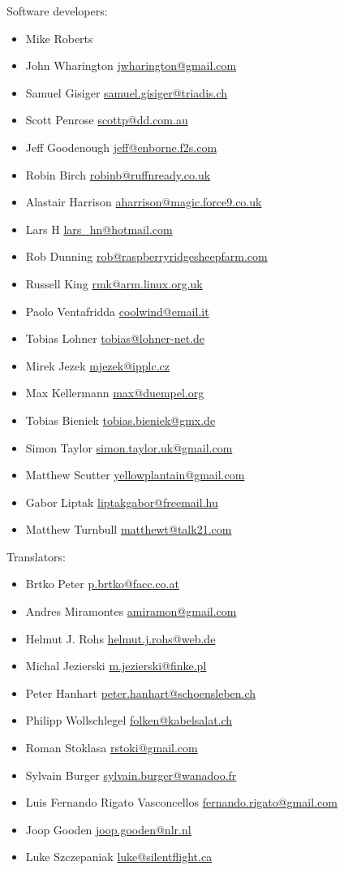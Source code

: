 \documentclass[a4paper,12pt]{refrep}
\begin{document}
Software developers:
\begin{itemize}
\item Mike Roberts 
\item John Wharington \url{jwharington@gmail.com}
\item Samuel Gisiger \url{samuel.gisiger@triadis.ch}
\item Scott Penrose \url{scottp@dd.com.au}
\item Jeff Goodenough \url{jeff@enborne.f2s.com}
\item Robin Birch \url{robinb@ruffnready.co.uk}
\item Alastair Harrison \url{aharrison@magic.force9.co.uk}
\item Lars H \url{lars_hn@hotmail.com}
\item Rob Dunning \url{rob@raspberryridgesheepfarm.com}
\item Russell King \url{rmk@arm.linux.org.uk}
\item Paolo Ventafridda \url{coolwind@email.it}
\item Tobias Lohner \url{tobias@lohner-net.de}
\item Mirek Jezek \url{mjezek@ipplc.cz}
\item Max Kellermann \url{max@duempel.org}
\item Tobias Bieniek \url{tobias.bieniek@gmx.de}
\item Simon Taylor \url{simon.taylor.uk@gmail.com}
\item Matthew Scutter \url{yellowplantain@gmail.com}
\item Gabor Liptak \url{liptakgabor@freemail.hu}
\item Matthew Turnbull \url{matthewt@talk21.com}
\end{itemize}

Translators:
\begin{itemize}
\item Brtko Peter \url{p.brtko@facc.co.at}
\item Andres Miramontes \url{amiramon@gmail.com}
\item Helmut J. Rohs \url{helmut.j.rohs@web.de}
\item Michal Jezierski \url{m.jezierski@finke.pl}
\item Peter Hanhart \url{peter.hanhart@schoensleben.ch}
\item Philipp Wollschlegel \url{folken@kabelsalat.ch}
\item Roman Stoklasa \url{rstoki@gmail.com}
\item Sylvain Burger \url{sylvain.burger@wanadoo.fr}
\item Luis Fernando Rigato Vasconcellos \url{fernando.rigato@gmail.com}
\item Joop Gooden \url{joop.gooden@nlr.nl}
\item Luke Szczepaniak \url{luke@silentflight.ca}
\end{itemize}
\end{document}
